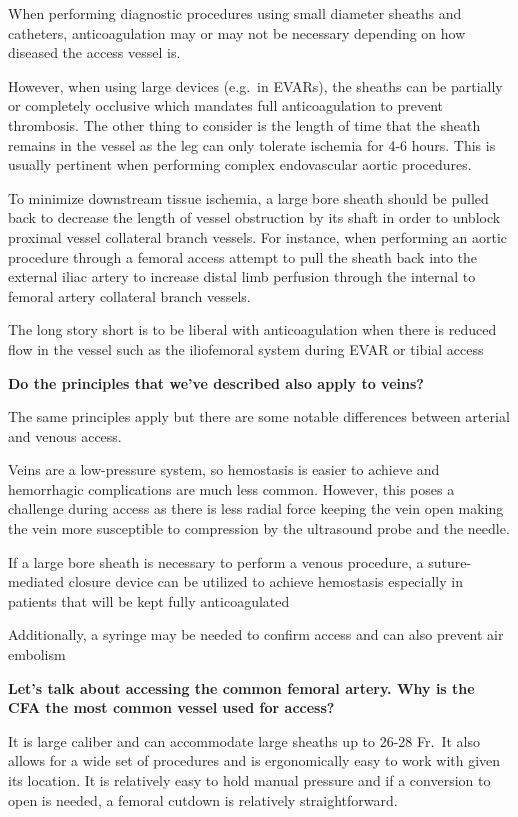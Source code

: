 \documentclass[
]{book}
\begin{document}
When performing diagnostic procedures using small diameter sheaths and
catheters, anticoagulation may or may not be necessary depending on how
diseased the access vessel is.

However, when using large devices (e.g.~in EVARs), the sheaths can be
partially or completely occlusive which mandates full anticoagulation to
prevent thrombosis. The other thing to consider is the length of time
that the sheath remains in the vessel as the leg can only tolerate
ischemia for 4-6 hours. This is usually pertinent when performing
complex endovascular aortic procedures.

To minimize downstream tissue ischemia, a large bore sheath should be
pulled back to decrease the length of vessel obstruction by its shaft in
order to unblock proximal vessel collateral branch vessels. For
instance, when performing an aortic procedure through a femoral access
attempt to pull the sheath back into the external iliac artery to
increase distal limb perfusion through the internal to femoral artery
collateral branch vessels.~~

The long story short is to be liberal with anticoagulation when there is
reduced flow in the vessel such as the iliofemoral system during EVAR or
tibial access

\textbf{Do the principles that we've described also apply to veins?}

The same principles apply but there are some notable differences between
arterial and venous access.

Veins are a low-pressure system, so hemostasis is easier to achieve and
hemorrhagic complications are much less common. However, this poses a
challenge during access as there is less radial force keeping the vein
open making the vein more susceptible to compression by the ultrasound
probe and the needle.

If a large bore sheath is necessary to perform a venous procedure, a
suture-mediated closure device can be utilized to achieve hemostasis
especially in patients that will be kept fully anticoagulated

Additionally, a syringe may be needed to confirm access and can also
prevent air embolism

\textbf{Let's talk about accessing the common femoral artery. Why is the CFA
the most common vessel used for access?}

It is large caliber and can accommodate large sheaths up to 26-28 Fr.~It
also allows for a wide set of procedures and is ergonomically easy to
work with given its location. It is relatively easy to hold manual
pressure and if a conversion to open is needed, a femoral cutdown is
relatively straightforward.
\end{document}
